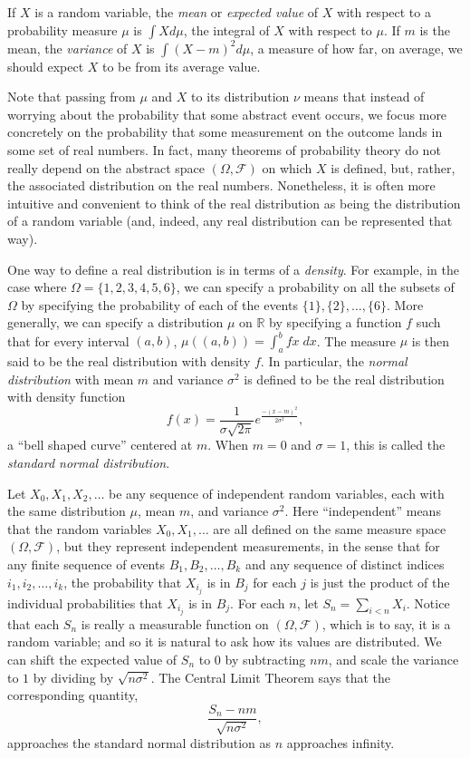 \documentclass{article}
\newcommand{\RR}{\mathbb{R}}
\newcommand{\mdl}[1]{{\mathcal #1}}
\begin{document}
If $X$ is a random variable, the \emph{mean} or \emph{expected value} of $X$ with respect to a probability measure $\mu$ is $\int X d\mu$, the integral of $X$ with respect to $\mu$. If $m$ is the mean, the \emph{variance} of $X$ is $\int (X - m)^2 d\mu$, a measure of how far, on average, we should expect $X$ to be from its average value.

Note that passing from $\mu$ and $X$ to its distribution $\nu$ means that instead of worrying about the probability that some abstract event occurs, we focus more concretely on the probability that some measurement on the outcome lands in some set of real numbers. In fact, many theorems of probability theory do not really depend on the abstract space $(\Omega, \mdl F)$ on which $X$ is defined, but, rather, the associated distribution on the real numbers. Nonetheless, it is often more intuitive and convenient to think of the real distribution as being the distribution of a random variable (and, indeed, any real distribution can be represented that way). 

One way to define a real distribution is in terms of a \emph{density}. For example, in the case where $\Omega = \{1, 2, 3, 4, 5, 6\}$, we can specify a probability on all the subsets of $\Omega$ by specifying the probability of each of the events $\{1\}, \{2\}, \ldots, \{6\}$. More generally, we can specify a distribution $\mu$ on $\RR$ by specifying a function $f$ such that for every interval $(a, b)$, $\mu((a, b)) = \int_a^b f x \; \mathit{dx}$. The measure $\mu$ is then said to be the real distribution with density $f$. In particular, the \emph{normal distribution} with mean $m$ and variance $\sigma^2$ is defined to be the real distribution with density function
\[
f(x) = \frac{1}{\sigma \sqrt{2 \pi}} e^\frac{-(x - m)^2}{2 \sigma^2}, 
\]
a ``bell shaped curve'' centered at $m$. When $m = 0$ and $\sigma = 1$, this is called the \emph{standard normal distribution}.

Let $X_0, X_1, X_2, \ldots$ be any sequence of independent random variables, each with the same distribution $\mu$, mean $m$, and variance $\sigma^2$. Here ``independent'' means that the random variables $X_0, X_1, \ldots$ are all defined on the same measure space $(\Omega, \mdl F)$, but they represent independent measurements, in the sense that for any finite sequence of events $B_1, B_2, \ldots, B_k$ and any sequence of distinct indices $i_1, i_2, \ldots, i_k$, the probability that $X_{i_j}$ is in $B_j$ for each $j$ is just the product of the individual probabilities that $X_{i_j}$ is in $B_j$. For each $n$, let $S_n = \sum_{i < n} X_i$. Notice that each $S_n$ is really a measurable function on $(\Omega, \mdl F)$, which is to say, it is a random variable; and so it is natural to ask how its values are distributed. We can shift the expected value of $S_n$ to $0$ by subtracting $n m$, and scale the variance to $1$ by dividing by $\sqrt{ n \sigma^2}$. The Central Limit Theorem says that the corresponding quantity,
\[
 \frac{S_n - nm}{\sqrt{n \sigma^2}},
\]
approaches the standard normal distribution as $n$ approaches infinity.
\end{document}
